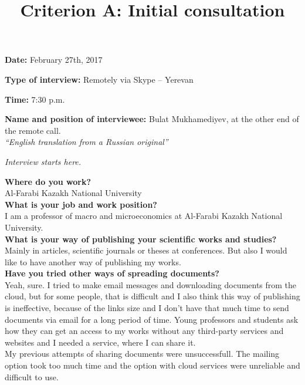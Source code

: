 \documentclass[a4paper]{article}
\title{Criterion A: Initial consultation}
\date{}
\begin{document}
\maketitle
\textbf{Date:} February 27th, 2017

\textbf{Type of interview:} Remotely via Skype – Yerevan 

\textbf{Time:} 7:30 p.m. 

\textbf{Name and position of interviewee:} Bulat Mukhamediyev, at the other end of the remote call.\\

\textit{“English translation from a Russian original”}\\

\begin{center}
    \textit{Interview starts here.}
\end{center}

\textbf{Where do you work?}\\

Al-Farabi Kazakh National University\\

\textbf{What is your job and work position?}\\

I am a professor of macro and microeconomics at Al-Farabi Kazakh National University.\\

\textbf{What is your way of publishing your scientific works and studies?}\\

Mainly in articles, scientific journals or theses at conferences. But also I would like to have another way of publishing my works.\\

\textbf{Have you tried other ways of spreading documents?}\\

Yeah, sure. I tried to make email messages and downloading documents from the cloud, but for some people, that is difficult and I also think this way of publishing is ineffective, because of the links size and I don’t have that much time to send documents via email for a long period of time. Young professors and students ask how they can get an access to my works without any third-party services and websites and I needed a service, where I can share it.\\

My previous attempts of sharing documents were unsuccessfull. The mailing option took too much time and the option with cloud services were unreliable and difficult to use.\\
\end{document}
